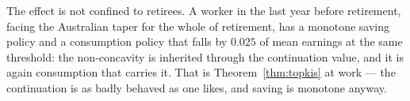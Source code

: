 The effect is not confined to retirees. A worker in the last year before retirement, facing the
Australian taper for the whole of retirement, has a monotone saving policy and a consumption policy
that falls by $0.025$ of mean earnings at the same threshold: the non-concavity is inherited
through the continuation value, and it is again consumption that carries it. That is
Theorem~\ref{thm:topkis} at work --- the continuation is as badly behaved as one likes, and saving
is monotone anyway.
